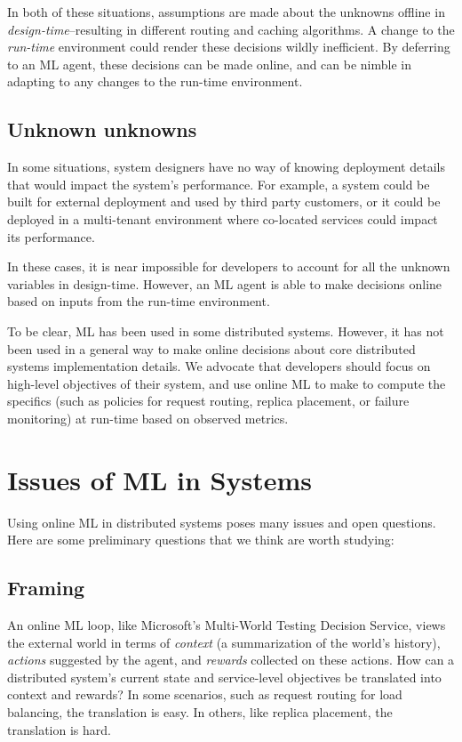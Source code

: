 \documentclass[a4paper,twocolumn]{article}
\begin{document}
In both of these situations, assumptions are made about the unknowns offline in
\emph{design-time}--resulting in different routing and caching
algorithms. A change to the \emph{run-time} environment could render these
decisions wildly inefficient. By deferring to an ML agent, these decisions can
be made online, and can be nimble in adapting to any changes to the run-time
environment.

\subsection*{Unknown unknowns}
In some situations, system designers have no way of knowing deployment details
that would impact the system's performance. For example, a system could be built
for external deployment and used by third party customers, or it could be
deployed in a multi-tenant environment where co-located services could impact
its performance.

In these cases, it is near impossible for developers to account for all the
unknown variables in design-time. However, an ML agent is able to make decisions
online based on inputs from the run-time environment.

To be clear, ML has been used in some distributed systems. However, it has not
been used in a general way to make online decisions about core distributed
systems implementation details. We advocate that developers should focus on
high-level objectives of their system, and use online ML to make to compute the
specifics (such as policies for request routing, replica placement, or failure
monitoring) at run-time based on observed metrics.



\section{Issues of ML in Systems}

Using online ML in distributed systems poses many issues and open questions.
Here are some preliminary questions that we think are worth studying:

\subsection*{Framing}
An online ML loop, like Microsoft's Multi-World Testing Decision Service, views
the external world in terms of \emph{context} (a summarization of the world's
history), \emph{actions} suggested by the agent, and \emph{rewards} collected on
these actions. How can a distributed system's current state and service-level
objectives be translated into context and rewards? In some scenarios, such as
request routing for load balancing, the translation is easy. In others, like
replica placement, the translation is hard.
\end{document}
